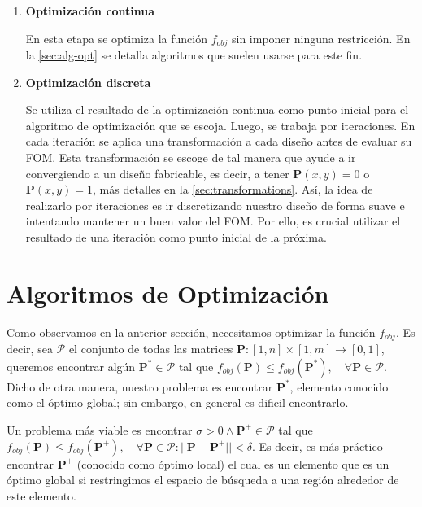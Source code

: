 \begin{enumerate}

\item{\textbf{Optimización continua}}

En esta etapa se optimiza la función $f_{obj}$ sin imponer ninguna restricción.
    En la \autoref{sec:alg-opt} se detalla algoritmos que suelen usarse para este fin.

\item{\textbf{Optimización discreta}}

Se utiliza el resultado de la optimización continua como punto inicial para el algoritmo de optimización que se escoja.
Luego, se trabaja por iteraciones.
En cada iteración se aplica una transformación a cada diseño antes de evaluar su FOM.
Esta transformación se escoge de tal manera que ayude a ir convergiendo a un diseño fabricable, es decir,
a tener $\boldsymbol{P}(x, y) = 0$ o $\boldsymbol{P}(x, y) = 1$, más detalles en la \autoref{sec:transformations}.
Así, la idea de realizarlo por iteraciones es ir discretizando nuestro diseño
de forma suave e intentando mantener un buen valor del FOM.
Por ello, es crucial utilizar el resultado de una iteración como punto inicial de la próxima.

\end{enumerate}

\section{Algoritmos de Optimización}\label{sec:alg-opt}

Como observamos en la anterior sección, necesitamos optimizar la función $f_{obj}$.
Es decir, sea $\pmb{\mathscr{P}}$ el conjunto de todas las matrices 
$\boldsymbol{P}: [1, n] \times [1, m] \to [0, 1]$, queremos encontrar algún 
$\boldsymbol{P^{*}} \in \pmb{\mathscr{P}}$ tal que 
$f_{obj}(\boldsymbol{P}) \leq f_{obj}(\boldsymbol{P^{*}}), \quad \forall \boldsymbol{P} \in \pmb{\mathscr{P}}$. 
Dicho de otra manera, nuestro problema es encontrar $\boldsymbol{P^{*}}$, 
elemento conocido como el óptimo global; sin embargo, en general es dificil encontrarlo.

Un problema más viable es encontrar $\sigma > 0 \land \boldsymbol{P^{+}} \in \pmb{\mathscr{P}}$ 
tal que 
$f_{obj}(\boldsymbol{P}) \leq f_{obj}(\boldsymbol{P^{+}}), \quad \forall \boldsymbol{P} \in \pmb{\mathscr{P}}:
|| \boldsymbol{P} - \boldsymbol{P^{+}}|| < \delta$.
Es decir, es más práctico encontrar $\boldsymbol{P^{+}}$ (conocido como óptimo local)
el cual es un elemento que es un óptimo global si restringimos el espacio de búsqueda a una región
alrededor de este elemento.


